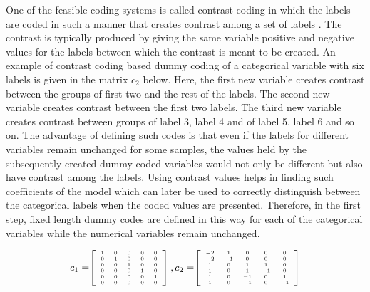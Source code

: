 \documentclass{article}
\begin{document}
One of the feasible coding systems is called contrast coding in which the labels are coded in such a manner that creates contrast among a set of labels \cite{ScaleUp_MLSP:stockburger01}. The contrast is typically produced by giving the same variable positive and negative values for the labels between which the contrast is meant to be created. An example of contrast coding based dummy coding of a categorical variable with six labels is given in the matrix $c_2$ below. Here, the first new variable creates contrast between the groups of first two and the rest of the labels. The second new variable creates contrast between the first two labels. The third new variable creates contrast between groups of label 3, label 4 and of label 5, label 6 and so on. The advantage of defining such codes is that even if the labels for different variables remain unchanged for some samples, the values held by the subsequently created dummy coded variables would not only be different but also have contrast among the labels. Using contrast values helps in finding such coefficients of the model which can later be used to correctly distinguish between the categorical labels when the coded values are presented. Therefore, in the first step, fixed length dummy codes are defined in this way for each of the categorical variables while the numerical variables remain unchanged.

\vspace{-4mm}
$$
\begingroup
\everymath{\scriptstyle}
\tiny
c_1 = \hspace{-1mm} \left[ \begin{array}{ccccc}
1 & 0 & 0 & 0 & 0 \\ 0 & 1 & 0 & 0 & 0 \\ 0 & 0 & 1 & 0 & 0 \\ 0 & 0 & 0 & 1 & 0 \\ 0 & 0 & 0 & 0 & 1 \\ 0 & 0 & 0 & 0 & 0 \\\end{array}\right], c_2 = \hspace{-1mm} \left[ \begin{array}{ccccc}
-2 & 1 & 0 & 0 & 0 \\ -2 & -1 & 0 & 0 & 0 \\ 1 & 0 & 1 & 1 & 0 \\ 1 & 0 & 1 & -1 & 0 \\ 1 & 0 & -1 & 0 & 1 \\ 1 & 0 & -1 & 0 & -1 \\
\end{array}\right]
\vspace{-2mm}
\endgroup
$$
\end{document}
